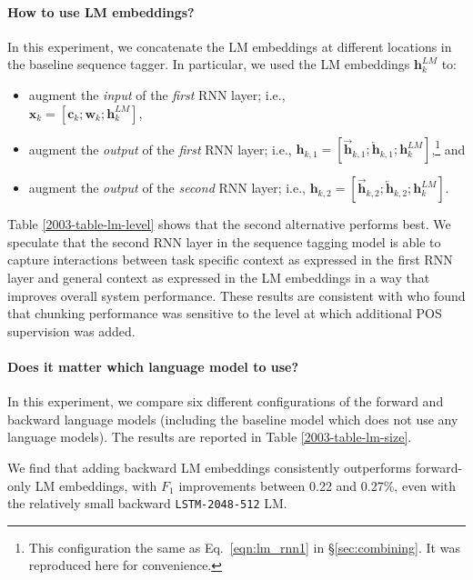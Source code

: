 \documentclass[11pt,a4paper]{article}
\begin{document}
\paragraph{How to use LM embeddings?}
In this experiment, we concatenate the LM embeddings at different locations in the baseline sequence tagger.
In particular, we used the LM embeddings $\mathbf{h}_k^{LM}$ to:
\begin{itemize}
\item augment the \textit{input} of the \textit{first} RNN layer; i.e., \\
$\mathbf{x}_k  = [\mathbf{c}_k; \mathbf{w}_k; \mathbf{h}_k^{LM}]$,
\item augment
the \textit{output} of the \textit{first} RNN layer; i.e.,
$\mathbf{h}_{k,1} = [\overrightarrow{\mathbf{h}}_{k,1}; \overleftarrow{\mathbf{h}}_{k,1}; \mathbf{h}_k^{LM}]$,\footnote{This configuration the same as Eq.~\ref{eqn:lm_rnn1} in \S\ref{sec:combining}. It was reproduced here for convenience.} and
\item augment the \textit{output} of the \textit{second} RNN layer; i.e., $\mathbf{h}_{k,2}  = [\overrightarrow{\mathbf{h}}_{k,2}; \overleftarrow{\mathbf{h}}_{k,2}; \mathbf{h}_k^{LM}]$.
\end{itemize}

Table \ref{2003-table-lm-level} shows that the second alternative
performs best.
We speculate that the second RNN layer in the sequence tagging
model is able to capture interactions between task specific context as
expressed in the first RNN layer and general context as expressed in the LM
embeddings in a way that improves overall
system performance.  These results are consistent with \citet{Sgaard2016DeepML} who found that chunking performance was sensitive
to the level at which additional POS supervision was added.





\paragraph{Does it matter which language model to use?} In this experiment, we compare six different configurations of the forward and backward language models (including the baseline model which does not use any language models).
The results are reported in Table \ref{2003-table-lm-size}.

We find that adding backward LM embeddings consistently outperforms forward-only LM embeddings, with $F_1$ improvements between 0.22 and 0.27\%, even with the relatively small backward \texttt{LSTM-2048-512} LM.
\end{document}
